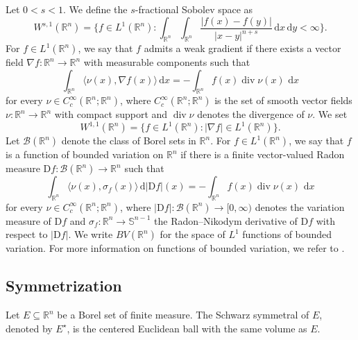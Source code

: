 \documentclass{amsart}
\newcommand{\Rvtex}{\mathbb R}
\newcommand{\snvtex}{{\mathbb S}^{n-1}}
\newcommand{\borel}{\mathcal{B} (\Rvtex^n)}
\newcommand{\dvtex}{\,\mathrm{d}}
\newcommand{\Dvtex}{\mathrm{D}}
\renewcommand \div {\operatorname{div}}
\begin{document}
Let $0<s<1$. We define the $s$-fractional Sobolev space as
%
\begin{equation*}
W^{s,1}(\mathbb R^{n}) = \Big\{f \in L^{1}(\mathbb R^{n}) : \int _{
\mathbb R^{n}}\int _{\mathbb R^{n}} \frac{|f(x)-f(y)|}{|x-y|^{n+s}}
\dvtex x \dvtex y < \infty \Big\}.
\end{equation*}
%
For $f\in L^{1}(\mathbb R^{n})$, we say that $f$ admits a weak gradient
if there exists a vector field
$\nabla f:\mathbb R^{n} \to \mathbb R^{n}$ with measurable components such
that
%
\begin{equation*}
\int _{\mathbb R^{n}} \langle \nu (x), \nabla f(x) \rangle \dvtex x= -
\int _{\mathbb R^{n}} f(x)\div \nu (x) \, \dvtex x
\end{equation*}
%
for every $\nu \in C^{\infty}_{c}(\mathbb R^{n};\mathbb R^{n})$, where
$C_{c}^{\infty}(\mathbb R^{n};\mathbb R^{n})$ is the set of smooth vector
fields $\nu : \mathbb R^{n}\to \mathbb R^{n}$ with compact support and
$\div \nu $ denotes the divergence of $\nu $. We set
%
\begin{equation*}
W^{1,1}(\mathbb R^{n}) = \big\{f \in L^{1}(\mathbb R^{n}) : \vert
\nabla f \vert \in L^{1}(\mathbb R^{n})\big\}.
\end{equation*}
%
Let $\borel $ denote the class of Borel sets in $\mathbb R^{n}$. For
$f\in L^{1}(\mathbb R^{n})$, we say that $f$ is a function of bounded variation
on $\mathbb R^{n}$ if there is a finite vector-valued Radon measure
$\Dvtex f: \borel \to \mathbb R^{n}$ such that
%
\begin{equation}
\label{eq_bv}
\int _{\mathbb R^{n}} \langle \nu (x), \sigma _{f}(x) \rangle \dvtex
\vert \Dvtex f\vert (x) = - \int _{\mathbb R^{n}} f(x)\div \nu (x) \, \dvtex x
\end{equation}
%
for every $\nu \in C_{c}^{\infty}(\mathbb R^{n}; \mathbb R^{n})$, where
$\vert \Dvtex f\vert : \borel \to [0,\infty )$ denotes the variation measure
of $\Dvtex f$ and $\sigma _{f}: \mathbb R^{n} \to \snvtex $ the Radon--Nikodym
derivative of $\Dvtex f$ with respect to $\vert \Dvtex f\vert $. We write
$BV(\mathbb R^{n})$ for the space of $L^{1}$ functions of bounded variation.
For more information on functions of bounded variation, we refer to
\cite[Chapter~5]{Evans:Gariepy}.

\subsection{Symmetrization}

Let $E \subseteq \mathbb R^{n}$ be a Borel set of finite measure. The Schwarz
symmetral of $E$, denoted by $E^{\star}$, is the centered Euclidean ball
with the same volume as $E$.
\end{document}
